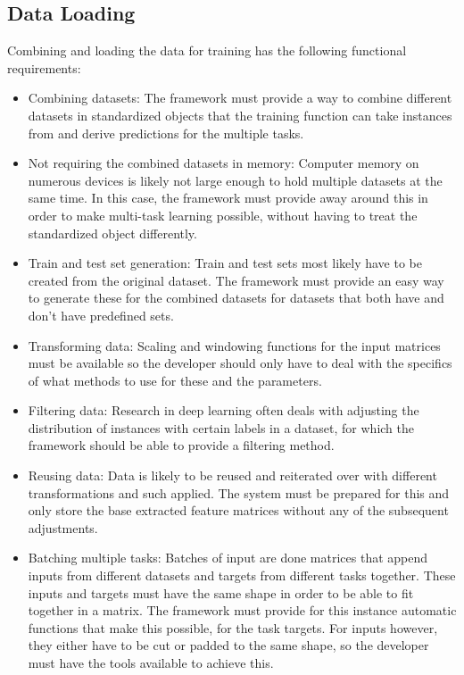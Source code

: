 \subsection{Data Loading}

Combining and loading the data for training has the following functional requirements:

\begin{itemize}
	\item Combining datasets: The framework must provide a way to combine different datasets in standardized objects that the training function can take instances from and derive predictions for the multiple tasks.
	\item Not requiring the combined datasets in memory: Computer memory on numerous devices is likely not large enough to hold multiple datasets at the same time. In this case, the framework must provide away around this in order to make multi-task learning possible, without having to treat the standardized object differently.
	\item Train and test set generation: Train and test sets most likely have to be created from the original dataset. The framework must provide an easy way to generate these for the combined datasets for datasets that both have and don't have predefined sets.
	\item Transforming data: Scaling and windowing functions for the input matrices must be available so the developer should only have to deal with the specifics of what methods to use for these and the parameters. 
	\item Filtering data: Research in deep learning often deals with adjusting the distribution of instances with certain labels in a dataset, for which the framework should be able to provide a filtering method.
	\item Reusing data: Data is likely to be reused and reiterated over with different transformations and such applied. The system must be prepared for this and only store the base extracted feature matrices without any of the subsequent adjustments.
	\item Batching multiple tasks: Batches of input are done matrices that append inputs from different datasets and targets from different tasks together. These inputs and targets must have the same shape in order to be able to fit together in a matrix. The framework must provide for this instance automatic functions that make this possible, for the task targets. For inputs however, they either have to be cut or padded to the same shape, so the developer must have the tools available to achieve this.

\end{itemize}
